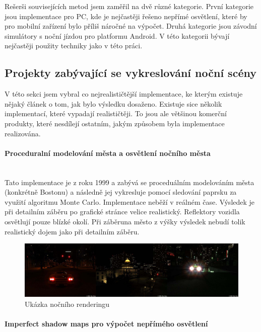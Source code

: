 \documentclass[11pt,twoside,a4paper]{book}
\begin{document}
Rešerši souvisejících metod jsem zaměřil na dvě různé kategorie. První kategorie jsou implementace pro PC, kde je nejčastěji řešeno nepřímé osvětlení, které by pro mobilní zařízení bylo příliš náročné na výpočet. Druhá kategorie jsou závodní simulátory s noční jízdou pro platformu Android. V této kategorii bývají nejčastěji použity techniky jako v této práci.

\subsection{Projekty zabývající se vykreslování noční scény}

V této sekci jsem vybral co nejrealističtější implementace, ke kterým existuje nějaký článek o tom, jak bylo výsledku dosaženo. Existuje sice několik implementací, které vypadají realističtěji. To jsou ale většinou komerční produkty, které nesdílejí ostatním, jakým způsobem byla implementace realizována.

\paragraph{Proceduralní modelování města a osvětlení nočního města}\mbox{}\\

Tato implementace je z roku 1999 a zabývá se proceduálním modelováním města (konkrétně Bostonu) a následně jej vykresluje pomocí sledování paprsku za využití algoritmu Monte Carlo. Implementace neběží v reálném čase. Výsledek je při detailním záběru po grafické stránce velice realistický. Reflektory vozidla osvětlují pouze blízké okolí. Při záběru\linebreak na město z výšky výsledek nebudí tolik realistický dojem jako při detailním záběru.

\begin{center}
\begin{figure}[h!]
\includegraphics[width=150mm]{figures/NR.png}
\caption{Ukázka nočního renderingu}
\end{figure}
\end{center}

\paragraph{Imperfect shadow maps pro výpočet nepřímého osvětlení}\mbox{}\\
\end{document}
